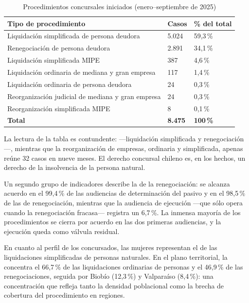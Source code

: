 \begin{table}[htbp]
\centering
\small
\caption{Procedimientos concursales iniciados (enero--septiembre de 2025)}
\label{tab:cap06-estadisticas}
\begin{tabularx}{\textwidth}{@{}>{\raggedright\arraybackslash}X p{} p{}@{}}
\toprule
\textbf{Tipo de procedimiento} & \textbf{Casos} & \textbf{\% del total} \\
\midrule
Liquidación simplificada de persona deudora & 5.024 & 59{,}3\,\% \\
Renegociación de persona deudora & 2.891 & 34{,}1\,\% \\
Liquidación simplificada MIPE & 387 & 4{,}6\,\% \\
Liquidación ordinaria de mediana y gran empresa & 117 & 1{,}4\,\% \\
Liquidación ordinaria de persona deudora & 24 & 0{,}3\,\% \\
Reorganización judicial de mediana y gran empresa & 24 & 0{,}3\,\% \\
Reorganización simplificada MIPE & 8 & 0{,}1\,\% \\
\midrule
\textbf{Total} & \textbf{8.475} & \textbf{100\,\%} \\
\bottomrule
\end{tabularx}
\end{table}

La lectura de la tabla es contundente:  ---liquidación simplificada y renegociación---, mientras que la
reorganización de empresas, ordinaria y simplificada, apenas reúne 32 casos en nueve meses. El
derecho concursal chileno es, en los hechos, un derecho de la insolvencia de la persona natural.

Un segundo grupo de indicadores describe la  de la
renegociación: se alcanza acuerdo en el 99{,}4\,\% de las audiencias de determinación del pasivo y
en el 98{,}5\,\% de las de renegociación, mientras que la audiencia de ejecución ---que sólo opera
cuando la renegociación fracasa--- registra un 6{,}7\,\%. La inmensa mayoría de los procedimientos
se cierra por acuerdo en las dos primeras audiencias, y la ejecución queda como válvula residual.

En cuanto al perfil de los concursados, las mujeres representan el  de las
liquidaciones simplificadas de personas naturales. En el plano territorial, la  concentra el 66{,}7\,\% de las liquidaciones ordinarias de personas y el 46{,}9\,\%
de las renegociaciones, seguida por Biobío (12{,}3\,\%) y Valparaíso (8{,}4\,\%): una concentración
que refleja tanto la densidad poblacional como la brecha de cobertura del procedimiento en
regiones.

